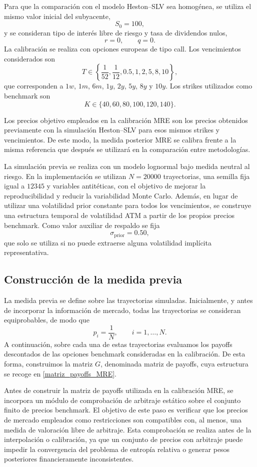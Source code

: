 Para que la comparación con el modelo Heston--SLV sea homogénea, se utiliza el mismo valor inicial del subyacente,
\[
S_0=100,
\]
y se consideran tipo de interés libre de riesgo y tasa de dividendos nulos,
\[
r=0, \qquad q=0.
\]
La calibración se realiza con opciones europeas de tipo call. Los vencimientos considerados son
\[
T\in
\left\{
\frac{1}{52},
\frac{1}{12},
0.5,
1,
2,
5,
8,
10
\right\},
\]
que corresponden a \(1w\), \(1m\), \(6m\), \(1y\), \(2y\), \(5y\), \(8y\) y \(10y\). Los strikes utilizados como benchmark son
\[
K\in\{40,60,80,100,120,140\}.
\]

Los precios objetivo empleados en la calibración MRE son los precios obtenidos previamente con la simulación Heston--SLV para esos mismos strikes y vencimientos. De este modo, la medida posterior MRE se calibra frente a la misma referencia que después se utilizará en la comparación entre metodologías.

La simulación previa se realiza con un modelo lognormal bajo medida neutral al riesgo. En la implementación se utilizan \(N=20000\) trayectorias, una semilla fija igual a \(12345\) y variables antitéticas, con el objetivo de mejorar la reproducibilidad y reducir la variabilidad Monte Carlo. Además, en lugar de utilizar una volatilidad prior constante para todos los vencimientos, se construye una estructura temporal de volatilidad ATM a partir de los propios precios benchmark. Como valor auxiliar de respaldo se fija
\[
\sigma_{\mathrm{prior}}=0.50,
\]
que solo se utiliza si no puede extraerse alguna volatilidad implícita representativa.

\subsection{Construcción de la medida previa}

La medida previa se define sobre las trayectorias simuladas. Inicialmente, y antes de incorporar la información de mercado, todas las trayectorias se consideran equiprobables, de modo que
\[
p_i=\frac{1}{N}, \qquad i=1,\ldots,N.
\]
A continuación, sobre cada una de estas trayectorias evaluamos los payoffs descontados de las opciones benchmark consideradas en la calibración. De esta forma, construimos la matriz \(G\), denominada matriz de payoffs, cuya estructura se recoge en \ref{matriz_payoffs_MRE}.\medskip

Antes de construir la matriz de payoffs utilizada en la calibración MRE, se incorpora un módulo de comprobación de arbitraje estático sobre el conjunto finito de precios benchmark. El objetivo de este paso es verificar que los precios de mercado empleados como restricciones son compatibles con, al menos, una medida de valoración libre de arbitraje. Esta comprobación se realiza antes de la interpolación o calibración, ya que un conjunto de precios con arbitraje puede impedir la convergencia del problema de entropía relativa o generar pesos posteriores financieramente inconsistentes.

